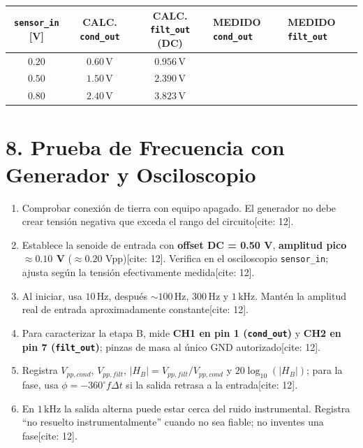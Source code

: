 \documentclass[11pt, a4paper]{article}
\begin{document}
\begin{center}
\begin{tabularx}{\textwidth}{@{} c c c L L @{}}
\toprule
\textbf{\texttt{sensor\_in} [V]} & \textbf{CALC. \texttt{cond\_out}} & \textbf{CALC. \texttt{filt\_out}} (DC) & \textbf{MEDIDO \texttt{cond\_out}} & \textbf{MEDIDO \texttt{filt\_out}} \\ \midrule
$0.20$ & $0.60\,\text{V}$ & $0.956\,\text{V}$ & & \\ \addlinespace[4pt]
$0.50$ & $1.50\,\text{V}$ & $2.390\,\text{V}$ & & \\ \addlinespace[4pt]
$0.80$ & $2.40\,\text{V}$ & $3.823\,\text{V}$ & & \\ \bottomrule
\end{tabularx}
\end{center}

\section{8. Prueba de Frecuencia con Generador y Osciloscopio}
\begin{enumerate}[noitemsep, leftmargin=*]
    \item Comprobar conexión de tierra con equipo apagado. El generador no debe crear tensión negativa que exceda el rango del circuito[cite: 12].
    \item Establece la senoide de entrada con \textbf{offset DC = 0.50 V}, \textbf{amplitud pico $\approx 0.10$ V} ($\approx 0.20$ Vpp)[cite: 12]. Verifica en el osciloscopio \texttt{sensor\_in}; ajusta según la tensión efectivamente medida[cite: 12].
    \item Al iniciar, usa $10\,\text{Hz}$, después $\sim 100\,\text{Hz}$, $300\,\text{Hz}$ y $1\,\text{kHz}$. Mantén la amplitud real de entrada aproximadamente constante[cite: 12].
    \item Para caracterizar la etapa B, mide \textbf{CH1 en pin 1 (\texttt{cond\_out})} y \textbf{CH2 en pin 7 (\texttt{filt\_out})}; pinzas de masa al único GND autorizado[cite: 12].
    \item Registra $V_{pp,cond}$, $V_{pp,filt}$, $|H_B| = V_{pp,filt}/V_{pp,cond}$ y $20\log_{10}(|H_B|)$; para la fase, usa $\phi = -360^\circ f \Delta t$ si la salida retrasa a la entrada[cite: 12].
    \item En $1\,\text{kHz}$ la salida alterna puede estar cerca del ruido instrumental. Registra ``no resuelto instrumentalmente'' cuando no sea fiable; no inventes una fase[cite: 12].
\end{enumerate}
\end{document}
